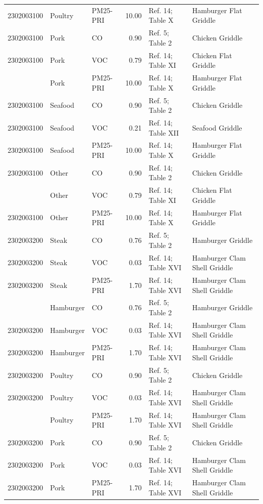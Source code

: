 \documentclass[
  11pt,
  oneside]{book}
\begin{document}
\begin{table}[H]
{\begin{tabular}[t]{rllrll}
2302003100 & Poultry & PM25-PRI & 10.00 & Ref. 14; Table X & Hamburger Flat Griddle\\
2302003100 & Pork & CO & 0.90 & Ref. 5; Table 2 & Chicken Griddle\\
2302003100 & Pork & VOC & 0.79 & Ref. 14; Table XI & Chicken Flat Griddle\\
\addlinespace
2302003100 & Pork & PM25-PRI & 10.00 & Ref. 14; Table X & Hamburger Flat Griddle\\
2302003100 & Seafood & CO & 0.90 & Ref. 5; Table 2 & Chicken Griddle\\
2302003100 & Seafood & VOC & 0.21 & Ref. 14; Table XII & Seafood Griddle\\
2302003100 & Seafood & PM25-PRI & 10.00 & Ref. 14; Table X & Hamburger Flat Griddle\\
2302003100 & Other & CO & 0.90 & Ref. 14; Table 2 & Chicken Griddle\\
\addlinespace
2302003100 & Other & VOC & 0.79 & Ref. 14; Table XI & Chicken Flat Griddle\\
2302003100 & Other & PM25-PRI & 10.00 & Ref. 14; Table X & Hamburger Flat Griddle\\
2302003200 & Steak & CO & 0.76 & Ref. 5; Table 2 & Hamburger Griddle\\
2302003200 & Steak & VOC & 0.03 & Ref. 14; Table XVI & Hamburger Clam Shell Griddle\\
2302003200 & Steak & PM25-PRI & 1.70 & Ref. 14; Table XVI & Hamburger Clam Shell Griddle\\
\addlinespace
2302003200 & Hamburger & CO & 0.76 & Ref. 5; Table 2 & Hamburger Griddle\\
2302003200 & Hamburger & VOC & 0.03 & Ref. 14; Table XVI & Hamburger Clam Shell Griddle\\
2302003200 & Hamburger & PM25-PRI & 1.70 & Ref. 14; Table XVI & Hamburger Clam Shell Griddle\\
2302003200 & Poultry & CO & 0.90 & Ref. 5; Table 2 & Chicken Griddle\\
2302003200 & Poultry & VOC & 0.03 & Ref. 14; Table XVI & Hamburger Clam Shell Griddle\\
\addlinespace
2302003200 & Poultry & PM25-PRI & 1.70 & Ref. 14; Table XVI & Hamburger Clam Shell Griddle\\
2302003200 & Pork & CO & 0.90 & Ref. 5; Table 2 & Chicken Griddle\\
2302003200 & Pork & VOC & 0.03 & Ref. 14; Table XVI & Hamburger Clam Shell Griddle\\
2302003200 & Pork & PM25-PRI & 1.70 & Ref. 14; Table XVI & Hamburger Clam Shell Griddle\\

\end{tabular}}
\end{table}
\end{document}
